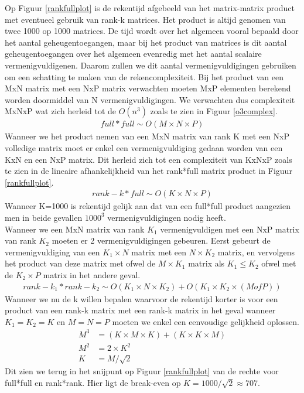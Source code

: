 \documentclass[a4paper]{article}
\begin{document}
Op Figuur \ref{rankfullplot} is de rekentijd afgebeeld van het matrix-matrix product met eventueel gebruik van rank-k matrices. Het product is altijd genomen van twee 1000 op 1000 matrices. De tijd wordt over het algemeen vooral bepaald door het aantal geheugentoegangen, maar bij het product van matrices is dit aantal geheugentoegangen over het algemeen evenredig met het aantal scalaire vermenigvuldigenen. Daarom zullen we dit aantal vermenigvuldigingen gebruiken om een schatting te maken van de rekencomplexiteit. Bij het product van een MxN matrix met een NxP matrix verwachten moeten MxP elementen berekend worden doormiddel van N vermenigvuldigingen. We verwachten dus complexiteit MxNxP wat zich herleid tot de \(O(n^3)\) zoals te zien in Figuur \ref{o3complex}.
\begin{equation}
\label{fullfull}
\begin{aligned}
	full*full \sim O(M\times N\times P)
\end{aligned}
\end{equation}
Wanneer we het product nemen van een MxN matrix van rank K met een NxP volledige matrix moet er enkel een vermenigvuldiging gedaan worden van een KxN en een NxP matrix. Dit herleid zich tot een complexiteit van KxNxP zoals te zien in de lineaire afhankelijkheid van het rank*full matrix product in Figuur \ref{rankfullplot}.
\begin{equation}
\label{rankfull}
\begin{aligned}
	rank-k*full \sim O(K\times N\times P)
\end{aligned}
\end{equation}
Wanneer K=1000 is rekentijd gelijk aan dat van een full*full product aangezien men in beide gevallen \(1000^3\) vermenigvuldigingen nodig heeft.\\
Wanneer we een MxN matrix van rank $K_1$ vermenigvuldigen met een NxP matrix van rank $K_2$ moeten er 2 vermenigvuldigingen gebeuren. Eerst gebeurt de vermenigvuldiging van een $K_1\times N$ matrix met een $N\times K_2$ matrix, en vervolgens het product van deze matrix met ofwel de $M\times K_1$ matrix als \(K_1 \leq K_2\) ofwel met de $K_2\times P$ matrix in het andere geval.
\begin{equation}
\label{rankrank}
\begin{aligned}
	rank-k_1*rank-k_2 \sim O(K_1\times N\times K_2) + O(K_1\times K_2\times (M of P))
\end{aligned}
\end{equation}
Wanneer we nu de k willen bepalen waarvoor de rekentijd korter is voor een product van een rank-k matrix met een rank-k matrix in het geval wanneer $K_1 = K_2 = K$ en $M=N=P$ moeten we enkel een eenvoudige gelijkheid oplossen.
\begin{equation}
\label{break-evenK}
\begin{aligned}
	M^3 &= (K\times M\times K) + (K\times K\times M) \\
	M^2 &= 2\times K^2 \\
	K &= M/\sqrt{2}
\end{aligned}
\end{equation}
Dit zien we terug in het snijpunt op Figuur \ref{rankfullplot} van de rechte voor full*full en rank*rank. Hier ligt de break-even op $K=1000/\sqrt{2} \approx 707$.
\end{document}
